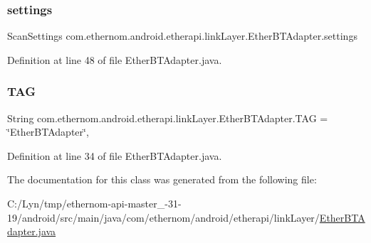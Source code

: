 \subsubsection{\texorpdfstring{settings}{settings}}
{\footnotesize\ttfamily Scan\+Settings com.\+ethernom.\+android.\+etherapi.\+link\+Layer.\+Ether\+B\+T\+Adapter.\+settings\hspace{0.3cm}{\ttfamily [private]}}



Definition at line 48 of file Ether\+B\+T\+Adapter.\+java.

\mbox{\label{classcom_1_1ethernom_1_1android_1_1etherapi_1_1link_layer_1_1_ether_b_t_adapter_acc66cd1a480350b141b85f4224b74c90}} 
\subsubsection{\texorpdfstring{T\+AG}{TAG}}
{\footnotesize\ttfamily String com.\+ethernom.\+android.\+etherapi.\+link\+Layer.\+Ether\+B\+T\+Adapter.\+T\+AG = \char`\"{}Ether\+B\+T\+Adapter\char`\"{}\hspace{0.3cm}{\ttfamily [static]}, {\ttfamily [package]}}



Definition at line 34 of file Ether\+B\+T\+Adapter.\+java.



The documentation for this class was generated from the following file\+:\begin{DoxyCompactItemize}
\item 
C\+:/\+Lyn/tmp/ethernom-\/api-\/master\+\_-\/31-\/19/android/src/main/java/com/ethernom/android/etherapi/link\+Layer/\mbox{\hyperlink{_ether_b_t_adapter_8java}{Ether\+B\+T\+Adapter.\+java}}\end{DoxyCompactItemize}
